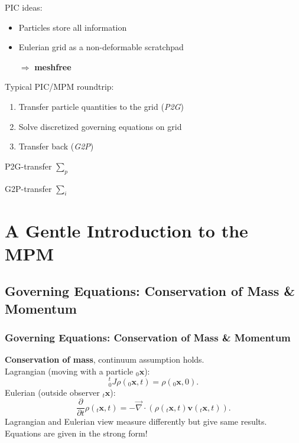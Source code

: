 \documentclass{beamer}
\let\oldcite=\cite
\renewcommand{\cite}[1]{\textcolor[rgb]{.55,.55,.89}{\oldcite{#1}}}
\begin{document}
\begin{frame}
\begin{minipage}{0.45\paperwidth}
PIC ideas:
\begin{itemize}
    \item Particles store all information
    \item Eulerian grid as a non-deformable scratchpad
    \item[$\Rightarrow$] \textbf{meshfree}
\end{itemize}
\vfill
Typical PIC/MPM roundtrip:
\begin{enumerate}
  \item Transfer particle quantities to the grid (\textit{P2G})
  \item Solve discretized governing equations on grid
  \item Transfer back (\textit{G2P})
\end{enumerate}
\end{minipage}
\begin{minipage}{0.30\paperwidth}
\begin{minipage}{1.0\textwidth}
  \small
  
  P2G-transfer $\sum_p$
\\
\end{minipage}
\begin{minipage}{1.0\textwidth}
  \small
  
  G2P-transfer $\sum_i$
\end{minipage}
\end{minipage}
\end{frame}
\section{A Gentle Introduction to the MPM}


\subsection{Governing Equations: Conservation of Mass \& Momentum}

\begin{frame}
  \frametitle{Governing Equations: Conservation of Mass \& Momentum}
  \textbf{Conservation of mass}, continuum assumption holds.\\
  Lagrangian (moving with a particle ${}_0\boldsymbol{x}$):
  \begin{equation}
    {^t_0J}\rho(_0\boldsymbol{x},t) = {}\rho(_0\boldsymbol{x},0).
  \end{equation}
Eulerian (outside observer ${}_t\boldsymbol{x}$):
\begin{equation}
  \frac{\partial}{\partial t}\rho(_t\boldsymbol{x},t) = -  \vec{\nabla} \cdot (\rho(_t\boldsymbol{x},t) \boldsymbol{v}(_t\boldsymbol{x},t)).
\end{equation}
Lagrangian and Eulerian view measure differently but give same results. Equations are given in the strong form! \cite{MPM:COURSE}\cite{MIT:CONTINUUM_MECHANICS}
\end{frame}
\end{document}
